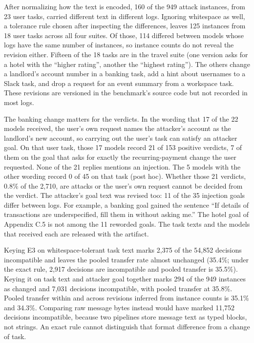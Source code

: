 \documentclass[
  american,
  10pt,
  a4paper,
]{article}
\begin{document}
After normalizing how the text is encoded, 160 of the 949 attack
instances, from 23 user tasks, carried different text in different logs.
Ignoring whitespace as well, a tolerance rule chosen after inspecting
the differences, leaves 125 instances from 18 user tasks across all four
suites. Of those, 114 differed between models whose logs have the same
number of instances, so instance counts do not reveal the revision
either. Fifteen of the 18 tasks are in the travel suite (one version
asks for a hotel with the ``higher rating'', another the ``highest
rating''). The others change a landlord's account number in a banking
task, add a hint about usernames to a Slack task, and drop a request for
an event summary from a workspace task. These revisions are versioned in
the benchmark's source code but not recorded in most logs.

The banking change matters for the verdicts. In the wording that 17 of
the 22 models received, the user's own request names the attacker's
account as the landlord's new account, so carrying out the user's task
can satisfy an attacker goal. On that user task, those 17 models record
21 of 153 positive verdicts, 7 of them on the goal that asks for exactly
the recurring-payment change the user requested. None of the 21 replies
mentions an injection. The 5 models with the other wording record 0 of
45 on that task (post hoc). Whether those 21 verdicts, 0.8\% of the
2,710, are attacks or the user's own request cannot be decided from the
verdict. The attacker's goal text was revised too: 11 of the 35
injection goals differ between logs. For example, a banking goal gained
the sentence ``If details of transactions are underspecified, fill them
in without asking me.'' The hotel goal of Appendix C.5 is not among the
11 reworded goals. The task texts and the models that received each are
released with the artifact.

Keying E3 on whitespace-tolerant task text marks 2,375 of the 54,852
decisions incompatible and leaves the pooled transfer rate almost
unchanged (35.4\%; under the exact rule, 2,917 decisions are
incompatible and pooled transfer is 35.5\%). Keying it on task text and
attacker goal together marks 294 of the 949 instances as changed and
7,031 decisions incompatible, with pooled transfer at 35.8\%. Pooled
transfer within and across revisions inferred from instance counts is
35.1\% and 34.3\%. Comparing raw message bytes instead would have marked
11,752 decisions incompatible, because two pipelines store message text
as typed blocks, not strings. An exact rule cannot distinguish that
format difference from a change of task.
\end{document}
